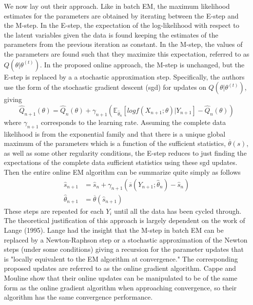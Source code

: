 \documentclass[12pt]{article}
\begin{document}
We now lay out their approach. Like in batch EM, the maximum likelihood estimates for the parameters are obtained by iterating between the E-step and the M-step. In the E-step, the expectation of the log-likelihood with respect to the latent variables given the data is found keeping the estimates of the parameters from the previous iteration as constant. In the M-step, the values of the parameters are found such that they maximize this expectation, referred to as $Q(\theta | \theta^{(t)})$. In the proposed online approach, the M-step is unchanged, but the E-step is replaced by a a stochastic approximation step. Specifically, the authors use the form of the stochastic gradient descent (sgd) for updates on $Q(\theta | \theta^{(t)})$, giving
\begin{equation}
\hat{Q}_{n+1}(\theta) = \hat{Q}_{n}(\theta) + \gamma_{n+1}(\mathbb{E}_{\hat{\theta}_{n}}[log f(X_{n+1};\theta)|Y_{n+1}] - \hat{Q}_{n}(\theta))
\end{equation}
where $\gamma_{n+1}$ corresponds to the learning rate. Assuming the complete data likelihood is from the exponential family and that there is a unique global maximum of the parameters which is a function of the sufficient statistics, $\overline{\theta}(s)$,  as well as some other regularity conditions, the E-step reduces to just finding the expectations of the complete data sufficient statistics using these sgd updates. Then the entire online EM algorithm can be summarize quite simply as follows
\begin{align}
\hat{s}_{n+1} &= \hat{s}_{n} + \gamma_{n+1}(\overline{s}(Y_{n+1}; \hat{\theta}_{n}) - \hat{s}_{n}) \nonumber \\
\hat{\theta}_{n+1} &= \overline{\theta}(\hat{s}_{n+1})
\end{align}
These steps are repeated for each $Y_{i}$ until all the data has been cycled through.\\

The theoretical justification of this approach is largely dependent on the work of Lange (1995). Lange had the insight that the M-step in batch EM can be replaced by a Newton-Raphson step or a stochastic approximation of the Newton steps (under some conditions) giving a recursion for the parameter updates that is "locally equivalent to the EM algorithm at convergence." The corresponding proposed updates are referred to as the online gradient algorithm. Cappe and Mouline show that their online updates can be manipulated to be of the same form as the online gradient algorithm when approaching convergence, so their algorithm has the same convergence performance. 
\end{document}
